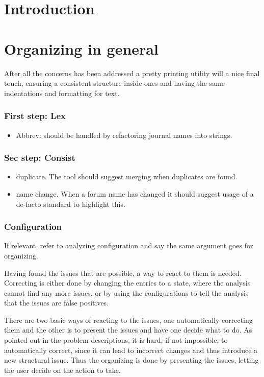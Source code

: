 \section{Introduction}

\section{Organizing in general}

After all the concerns has been addressed a pretty printing utility
will a nice final touch, ensuring a consistent structure inside ones
 and having the same indentations and formatting for text.

\subsubsection{First step: Lex}
\begin{itemize}
\item Abbrev: should be handled by refactoring journal names into
  strings.
\end{itemize}

\subsubsection{Sec step: Consist}
\begin{itemize}
\item duplicate.  The tool should suggest merging when duplicates are
  found.
\item name change. When a forum name has changed it should suggest
  usage of a de-facto standard to highlight this.
\end{itemize}

\subsubsection{Configuration}

If relevant, refer to analyzing configuration and say the same
argument goes for organizing.


Having found the issues that are possible, a way to react to them is
needed.  Correcting is either done by changing the entries to a state,
where the analysis cannot find any more issues, or by using the
configurations to tell the analysis that the issues are false
positives.

There are two basic ways of reacting to the issues, one
automatically correcting them and the other is to present the issues
and have one decide what to do.  As pointed out in the problem
descriptions, it is hard, if not impossible, to automatically correct,
since it can lead to incorrect changes and thus introduce a new
structural issue.  Thus the organizing is done by presenting the
issues, letting the user decide on the action to take.

